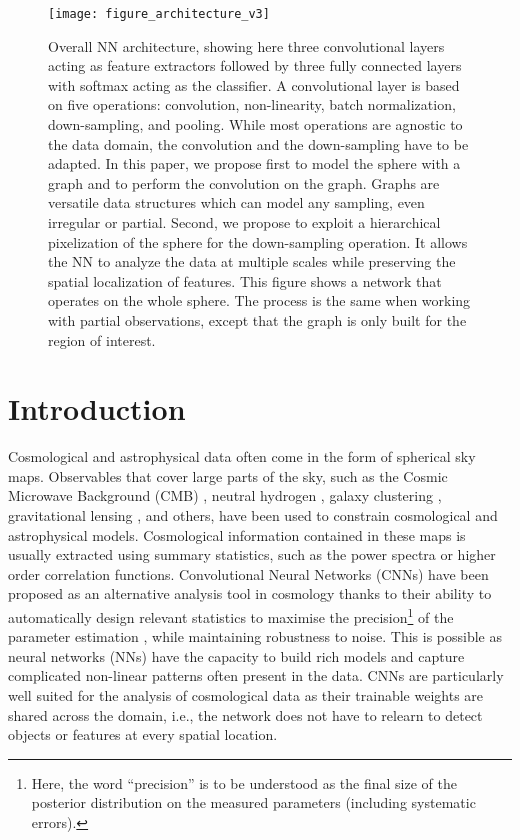 \documentclass[final,twocolumn,3p,times,sort&compress]{elsarticle}
\newcommand{\1}{\b{1}}              %
\newcommand{\0}{\b{0}}              %
\begin{document}
\begin{figure*}
	\centering
	\texttt{[image: figure\_architecture\_v3]}
	\caption{Overall NN architecture, showing here three convolutional layers acting as feature extractors followed by three fully connected layers with softmax acting as the classifier.
    A convolutional layer is based on five operations: convolution, non-linearity, batch normalization, down-sampling, and pooling.
	While most operations are agnostic to the data domain, the convolution and the down-sampling have to be adapted.
	In this paper, we propose first to model the sphere with a graph and to perform the convolution on the graph.
	Graphs are versatile data structures which can model any sampling, even irregular or partial.
	Second, we propose to exploit a hierarchical pixelization of the sphere for the down-sampling operation.
	It allows the NN to analyze the data at multiple scales while preserving the spatial localization of features.
	This figure shows a network that operates on the whole sphere.
	The process is the same when working with partial observations, except that the graph is only built for the region of interest.}
	\label{fig:architecture}
\end{figure*}

\section{Introduction}
\label{sec:intro}

Cosmological and astrophysical data often come in the form of spherical sky maps.
Observables that cover large parts of the sky, such as the Cosmic Microwave Background (CMB) \citep{planck2015cosmologicalparameters,komatsu2011sevenyear,staggs2018recentdiscoveries}, neutral hydrogen \citep{santos2015cosmologySKA,HI4PI2016fullskyHI}, galaxy clustering \citep{alam2017clusteringgalaxies}, gravitational lensing \citep{troxel2017darkenergy,hildebrandt2017kidscosmological}, and others, have been used to constrain cosmological and astrophysical models.
Cosmological information contained in these maps is usually extracted using summary statistics, such as the power spectra or higher order correlation functions.
Convolutional Neural Networks (CNNs) have been proposed as an alternative analysis tool in cosmology thanks to their ability to automatically design relevant statistics to maximise the precision\footnote{Here, the word ``precision'' is to be understood as the final size of the posterior distribution on the measured parameters (including systematic errors).} of the parameter estimation
\citep{schmelze2017cosmologicalmodel,luciesmith2018machinelearning,gupta2018nongaussianinformation,gillet2018deeplearning,hassan2018reionizationmodels,aragoncalvo2018classyfyinglarge,ciuca2017cnnstring,ravanbakhsh2017estimating}, while maintaining robustness to noise.
This is possible as neural networks (NNs) have the capacity to build rich models and capture complicated non-linear patterns often present in the data.
CNNs are particularly well suited for the analysis of cosmological data as their trainable weights are shared across the domain, i.e., the network does not have to relearn to detect objects or features at every spatial location.
\end{document}
